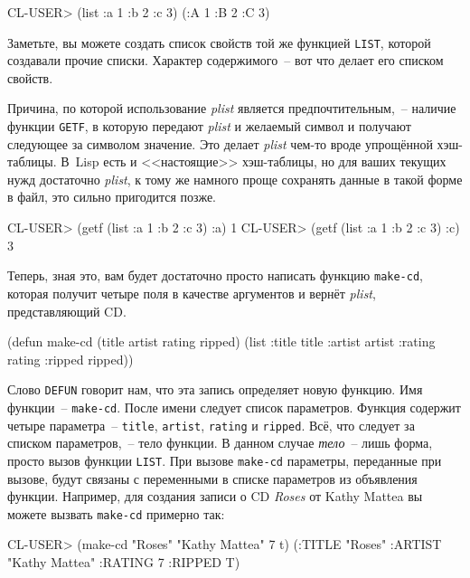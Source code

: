 \begin{myverb}
CL-USER> (list :a 1 :b 2 :c 3)
(:A 1 :B 2 :C 3)
\end{myverb}

Заметьте, вы можете создать список свойств той же функцией \lstinline{LIST}, которой создавали
прочие списки. Характер содержимого~-- вот что делает его списком свойств.

Причина, по которой использование \textit{plist} является предпочтительным,~-- наличие
функции \lstinline{GETF}, в которую передают \textit{plist} и желаемый символ и получают
следующее за символом значение. Это делает \textit{plist} чем-то вроде упрощённой
хэш-таблицы. В~Lisp есть и <<настоящие>> хэш-таблицы, но для ваших текущих нужд достаточно
\textit{plist}, к тому же намного проще сохранять данные в такой форме в файл, это сильно
пригодится позже.

\begin{myverb}
CL-USER> (getf (list :a 1 :b 2 :c 3) :a)
1
CL-USER> (getf (list :a 1 :b 2 :c 3) :c)
3
\end{myverb}

Теперь, зная это, вам будет достаточно просто написать функцию \lstinline{make-cd}, которая
получит четыре поля в качестве аргументов и вернёт \textit{plist}, представляющий CD.

\begin{myverb}
(defun make-cd (title artist rating ripped)
  (list :title title :artist artist :rating rating :ripped ripped))
\end{myverb}

Слово \lstinline{DEFUN} говорит нам, что
эта запись определяет новую функцию. Имя функции~-- \lstinline{make-cd}. После имени следует
список параметров. Функция содержит четыре параметра~-- \lstinline{title}, \lstinline{artist},
\lstinline{rating} и \lstinline{ripped}. Всё, что следует за списком параметров,~-- тело функции. В
данном случае \textit{тело}~-- лишь форма, просто вызов функции \lstinline{LIST}. При вызове
\lstinline{make-сd} параметры, переданные при вызове, будут связаны с переменными в списке
параметров из объявления функции. Например, для создания записи о CD \textit{Roses} от
Kathy Mattea вы можете вызвать \lstinline{make-cd} примерно так:

\begin{myverb}
CL-USER> (make-cd "Roses" "Kathy Mattea" 7 t)
(:TITLE "Roses" :ARTIST "Kathy Mattea" :RATING 7 :RIPPED T) 
\end{myverb}

